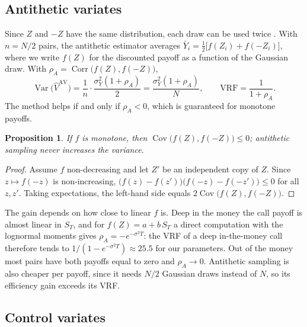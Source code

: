 \documentclass[11pt,a4paper]{article}
\newcommand{\Var}{\operatorname{Var}}
\newcommand{\Cov}{\operatorname{Cov}}
\newcommand{\Corr}{\operatorname{Corr}}
\newcommand{\1}{\mathbf{1}}
\theoremstyle{plain}
\newtheorem{proposition}{Proposition}
\theoremstyle{remark}
\begin{document}
\subsection{Antithetic variates}

Since $Z$ and $-Z$ have the same distribution, each draw can be used twice \citep{hammersley1956}. With
$n = N/2$ pairs, the antithetic estimator averages $\bar Y_i = \frac12\big[f(Z_i) + f(-Z_i)\big]$, where we write
$f(Z)$ for the discounted payoff as a function of the Gaussian draw. With $\rho_A = \Corr\big(f(Z), f(-Z)\big)$,
\begin{equation}
  \Var\big(\hat V^{\text{AV}}\big) = \frac{1}{n}\cdot\frac{\sigma_Y^2 (1 + \rho_A)}{2} = \frac{\sigma_Y^2 (1+\rho_A)}{N},
  \qquad \text{VRF} = \frac{1}{1 + \rho_A}.
\end{equation}
The method helps if and only if $\rho_A < 0$, which is guaranteed for monotone payoffs.

\begin{proposition}\label{prop:antithetic}
If $f$ is monotone, then $\Cov\big(f(Z), f(-Z)\big) \le 0$; antithetic sampling never increases the variance.
\end{proposition}
\begin{proof}
Assume $f$ non-decreasing and let $Z'$ be an independent copy of $Z$. Since $z \mapsto f(-z)$ is non-increasing,
$\big(f(z) - f(z')\big)\big(f(-z) - f(-z')\big) \le 0$ for all $z, z'$. Taking expectations, the left-hand side
equals $2\Cov\big(f(Z), f(-Z)\big)$.
\end{proof}

The gain depends on how close to linear $f$ is. Deep in the money the call payoff is almost linear in $S_T$,
and for $f(Z) = a + b\,S_T$ a direct computation with the lognormal moments gives $\rho_A = -e^{-\sigma^2 T}$:
the VRF of a deep in-the-money call therefore tends to $1/(1 - e^{-\sigma^2 T}) \approx 25.5$ for our parameters.
Out of the money most pairs have both payoffs equal to zero and $\rho_A \to 0$. Antithetic sampling is also cheaper per payoff, since it needs $N/2$ Gaussian draws
instead of $N$, so its efficiency gain exceeds its VRF.

\subsection{Control variates}
\end{document}
